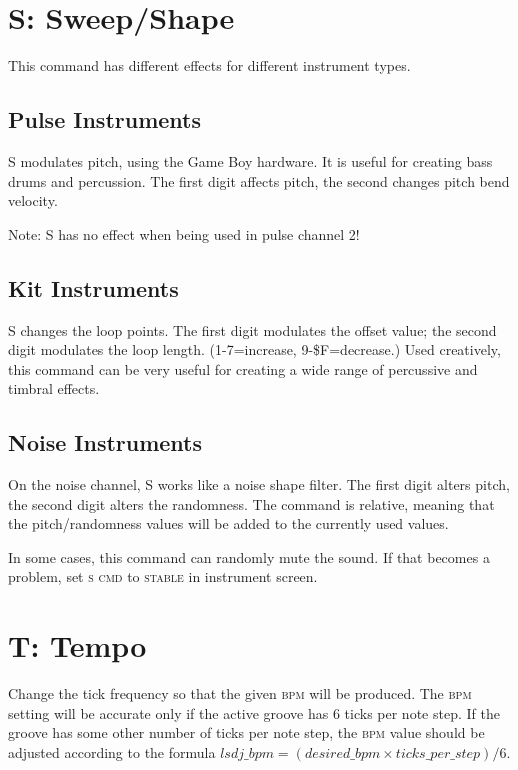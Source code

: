 \section{S: Sweep/Shape}

This command has different effects for different instrument types.

\subsection{Pulse Instruments}

S modulates pitch, using the Game Boy hardware. It is useful for creating bass drums and percussion. The first digit affects pitch, the second changes pitch bend velocity.

Note: S has no effect when being used in pulse channel 2!

\subsection{Kit Instruments}

S changes the loop points. The first digit modulates the offset value; the second digit modulates the loop length. (1-7=increase, 9-\$F=decrease.) Used creatively, this command can be very useful for creating a wide range of percussive and timbral effects.

\subsection{Noise Instruments}
\label{command-shape-noise}

On the noise channel, S works like a noise shape filter.
The first digit alters pitch, the second digit alters the randomness.
The command is relative, meaning that the pitch/randomness values
will be added to the currently used values.

In some cases, this command can randomly mute the sound. If that becomes a problem, set
\textsc{s cmd} to \textsc{stable} in instrument screen.

\section{T: Tempo}

Change the tick frequency so that the given \textsc{bpm} will be produced. The \textsc{bpm} setting will be accurate only if the active groove has 6 ticks per note step. If the groove has some other number of ticks per note step, the \textsc{bpm} value should be adjusted according to the formula
\begin{math}
lsdj\_bpm = (desired\_bpm \times ticks\_per\_step)/{6}
\end{math}.


